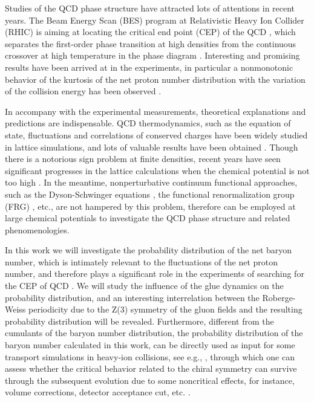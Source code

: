 \documentclass[%
reprint,
superscriptaddress,
showpacs,preprintnumbers,
 amsmath,amssymb,
 aps,
prd,
]{revtex4-1}
\begin{document}
Studies of the QCD phase structure have attracted lots of attentions in recent years. The Beam Energy Scan (BES) program at Relativistic Heavy Ion Collider (RHIC) is aiming at locating the critical end point (CEP) of the QCD \cite{Luo:2017faz}, which separates the first-order phase transition at high densities from the continuous crossover at high temperature in the phase diagram \cite{Stephanov:2007fk}. Interesting and promising results have been arrived at in the experiments, in particular a nonmonotonic behavior of the kurtosis of the net proton number distribution with the variation of the collision energy has been observed \cite{Adamczyk:2013dal,Luo:2015ewa}. 

In accompany with the experimental measurements, theoretical explanations and predictions are indispensable. QCD thermodynamics, such as the equation of state, fluctuations and correlations of conserved charges have been widely studied in lattice simulations, and lots of valuable results have been obtained \cite{Karsch:2001cy,Aoki:2006we,Cheng:2007jq,Borsanyi:2010cj}. Though there is a notorious sign problem at finite densities, recent years have seen significant progresses in the lattice calculations when the chemical potential is not too high \cite{Borsanyi:2014ewa,Ding:2015fca,Bazavov:2017dus,Bazavov:2017tot,Karsch:2017zzw,Borsanyi:2018grb}. In the meantime, nonperturbative continuum functional approaches, such as the Dyson-Schwinger equations \cite{Qin:2010nq,Xin:2014ela,Gao:2016qkh}, the functional renormalization group (FRG) \cite{Braun:2009gm,Herbst:2010rf,Haas:2013qwp,Herbst:2013ail,Herbst:2013ufa,Pawlowski:2014zaa,Skokov:2010wb,Skokov:2010uh,Morita:2013tu,Morita:2014fda,Almasi:2017bhq,Fu:2015naa,Fu:2015amv,Fu:2016tey,Fu:2017vvg,Fu:2018wxq}, etc., are not hampered by this problem, therefore can be employed at large chemical potentials to investigate the QCD phase structure and related phenomenologies.

In this work we will investigate the probability distribution of the net baryon number, which is intimately relevant to the fluctuations of the net proton number, and therefore plays a significant role in the experiments of searching for the CEP of QCD \cite{Luo:2017faz}. We will study the influence of the glue dynamics on the probability distribution, and an interesting interrelation between the Roberge-Weiss periodicity \cite{Roberge:1986mm} due to the Z(3) symmetry of the gluon fields and the resulting probability distribution will be revealed. Furthermore, different from the cumulants of the baryon number distribution, the probability distribution of the baryon number calculated in this work, can be directly used as input for some transport simulations in heavy-ion collisions, see e.g., \cite{Jiang:2015hri,Xu:2016skm}, through which one can assess whether the critical behavior related to the chiral symmetry can survive through the subsequent evolution due to some noncritical effects, for instance, volume corrections, detector acceptance cut, etc. \cite{Braun-Munzinger:2016yjz}.
\end{document}
